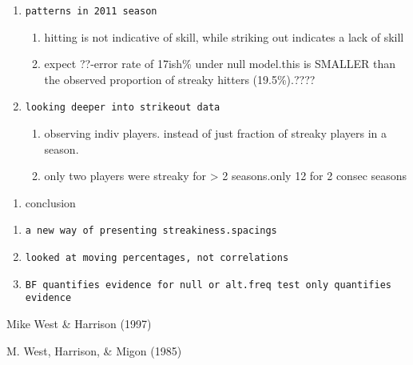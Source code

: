 \documentclass[12pt,twoside]{dukestatscithesis}
\providecommand{\tightlist}{%
  \setlength{\itemsep}{0pt}\setlength{\parskip}{0pt}}
\theoremstyle{definition}
\theoremstyle{definition}
\theoremstyle{definition}
\theoremstyle{remark}
\begin{document}
\begin{enumerate}
\def\labelenumi{\arabic{enumi}.}
\item
\begin{verbatim}
patterns in 2011 season
\end{verbatim}
  \begin{enumerate}
  \def\labelenumii{\alph{enumii}.}
  \tightlist
  \item
    hitting is not indicative of skill, while striking out indicates a
    lack of skill
  \item
    expect ??-error rate of 17ish\% under null model.this is SMALLER
    than the observed proportion of streaky hitters (19.5\%).????
  \end{enumerate}
\item
\begin{verbatim}
looking deeper into strikeout data
\end{verbatim}
  \begin{enumerate}
  \def\labelenumii{\alph{enumii}.}
  \tightlist
  \item
    observing indiv players. instead of just fraction of streaky players
    in a season.
  \item
    only two players were streaky for \textgreater{} 2 seasons.only 12
    for 2 consec seasons
  \end{enumerate}
\end{enumerate}
\begin{enumerate}
\def\labelenumi{\Alph{enumi}.}
\setcounter{enumi}{5}
\tightlist
\item
  conclusion
\end{enumerate}
\begin{enumerate}
\def\labelenumi{\arabic{enumi}.}
\item
\begin{verbatim}
a new way of presenting streakiness.spacings
\end{verbatim}
\item
\begin{verbatim}
looked at moving percentages, not correlations
\end{verbatim}
\item
\begin{verbatim}
BF quantifies evidence for null or alt.freq test only quantifies evidence 
\end{verbatim}
\end{enumerate}
Mike West \& Harrison (1997)

M. West, Harrison, \& Migon (1985)
\end{document}
